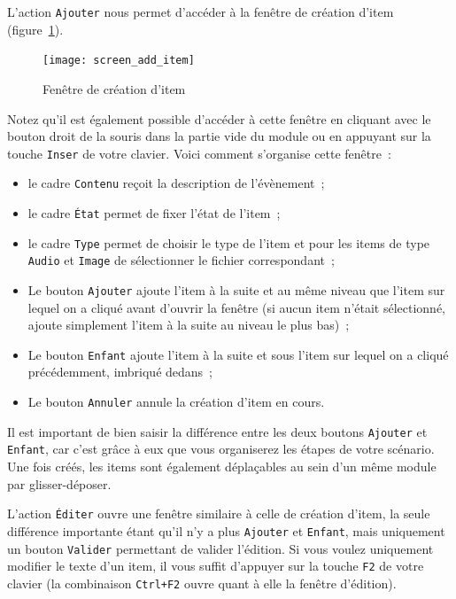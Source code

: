 \documentclass[a4paper,12pt]{article}
\newcommand*{\interfaceitem}[1]{\texttt{#1}}
\newcommand*{\guillemets}[1]{\og #1\fg{}\xspace}
\begin{document}
L'action \interfaceitem{Ajouter} nous permet d'accéder à la fenêtre de création d'item (figure~\ref{fig:ajout}).
\begin{figure}[h]
    \texttt{[image: screen\_add\_item]}
    \caption{Fenêtre de création d'item}
    \label{fig:ajout}
\end{figure}
Notez qu'il est également possible d'accéder à cette fenêtre en cliquant avec le bouton droit de la souris dans la partie vide du module ou en appuyant sur la touche \interfaceitem{Inser} de votre clavier.
Voici comment s'organise cette fenêtre~:
\begin{itemize}
    \item le cadre \interfaceitem{Contenu} reçoit la description de l'évènement~;
    \item le cadre \interfaceitem{État} permet de fixer l'état de l'item~;
    \item le cadre \interfaceitem{Type} permet de choisir le type de l'item et pour les items de type \interfaceitem{Audio} et \interfaceitem{Image} de sélectionner le fichier correspondant~;
    \item Le bouton \interfaceitem{Ajouter} ajoute l'item à la suite et au même niveau que l'item sur lequel on a cliqué avant d'ouvrir la fenêtre (si aucun item n'était sélectionné, ajoute simplement l'item à la suite au niveau le plus bas)~;
    \item Le bouton \interfaceitem{Enfant} ajoute l'item à la suite et sous l'item sur lequel on a cliqué précédemment, imbriqué dedans~;
    \item Le bouton \interfaceitem{Annuler} annule la création d'item en cours.
\end{itemize}
Il est important de bien saisir la différence entre les deux boutons \interfaceitem{Ajouter} et \interfaceitem{Enfant}, car c'est grâce à eux que vous organiserez les étapes de votre scénario.
Une fois créés, les items sont également déplaçables au sein d'un même module par \guillemets{glisser-déposer}.

L'action \interfaceitem{Éditer} ouvre une fenêtre similaire à celle de création d'item, la seule différence importante étant qu'il n'y a plus \interfaceitem{Ajouter} et \interfaceitem{Enfant}, mais uniquement un bouton \interfaceitem{Valider} permettant de valider l'édition.
Si vous voulez uniquement modifier le texte d'un item, il vous suffit d'appuyer sur la touche \interfaceitem{F2} de votre clavier (la combinaison \interfaceitem{Ctrl+F2} ouvre quant à elle la fenêtre d'édition).
\end{document}
